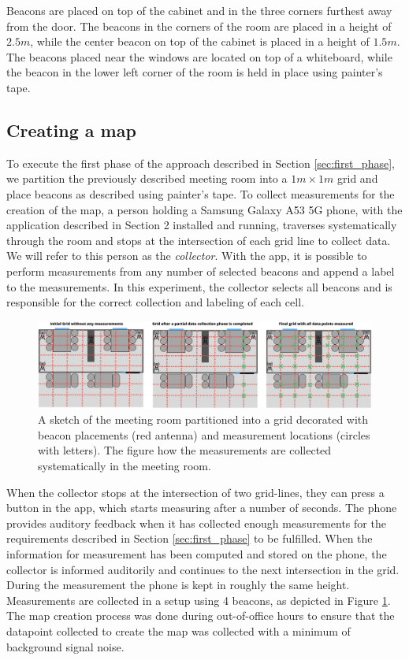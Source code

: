 Beacons are placed on top of the cabinet and in the three corners furthest away from the door. 
The beacons in the corners of the room are placed in a height of $2.5m$, while the center beacon on top of the cabinet is placed in a height of $1.5m$.   
The beacons placed near the windows are located on top of a whiteboard, while the beacon in the lower left corner of the room is held in place using painter's tape. 

\subsection{Creating a map}
To execute the first phase of the approach described in Section \ref{sec:first_phase},  we partition the previously described meeting room into a $1m \times 1m$ grid and place beacons as described using painter's tape.%
To collect measurements for the creation of the map, a person holding a Samsung Galaxy A53 5G phone, with the application described in Section 2 installed and running, traverses systematically through the room and stops at the intersection of each grid line to collect data. 
We will refer to this person as the \textit{collector}.
With the app, it is possible to perform measurements from any number of selected beacons and append a label to the measurements.
In this experiment, the collector selects all beacons and is responsible for the correct collection and labeling of each cell.
\begin{figure}[h]
    \centering
    \includegraphics[width=\textwidth]{images/experiment_map_creation.png}
    \caption{A sketch of the meeting room partitioned into a grid decorated with beacon placements (red antenna) and measurement locations (circles with letters). The figure how the measurements are collected systematically in the meeting room.}
    \label{fig:experiment_map_creation}
\end{figure}
When the collector stops at the intersection of two grid-lines, they can press a button in the app, which starts measuring after a number of seconds.
The phone provides auditory feedback when it has collected enough measurements for the requirements described in Section \ref{sec:first_phase} to be fulfilled.
When the information for measurement has been computed and stored on the phone, the collector is informed auditorily and continues to the next intersection in the grid. 
During the measurement the phone is kept in roughly the same height.
Measurements are collected in a setup using 4 beacons, as depicted in Figure \ref{fig:experiment_map_creation}.
The map creation process was done during out-of-office hours to ensure that the datapoint collected to create the map was collected with a minimum of background signal noise.  

